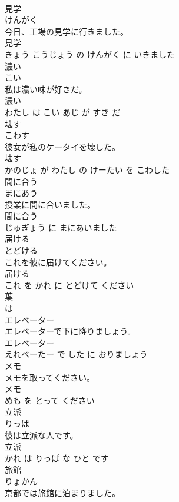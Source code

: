 \documentclass[8pt]{extreport}
\begin{document}
\begin{CJK}{UTF8}{min}
\\	見学	
\\	けんがく			
\\	今日、工場の見学に行きました。	
\\	見学 
\\	きょう こうじょう の けんがく に いきました			
\\	濃い	
\\	こい			
\\	私は濃い味が好きだ。	
\\	濃い 
\\	わたし は こい あじ が すき だ			
\\	壊す	
\\	こわす			
\\	彼女が私のケータイを壊した。	
\\	壊す 
\\	かのじょ が わたし の けーたい を こわした			
\\	間に合う	
\\	まにあう			
\\	授業に間に合いました。	
\\	間に合う 
\\	じゅぎょう に まにあいました			
\\	届ける	
\\	とどける			
\\	これを彼に届けてください。	
\\	届ける 
\\	これ を かれ に とどけて ください			
\\	葉	
\\	は			
\\	エレベーター	
\\	エレベーターで下に降りましょう。	
\\	エレベーター 
\\	えれべーたー で した に おりましょう			
\\	メモ	
\\	メモを取ってください。	
\\	メモ 
\\	めも を とって ください			
\\	立派	
\\	りっぱ			
\\	彼は立派な人です。	
\\	立派 
\\	かれ は りっぱ な ひと です			
\\	旅館	
\\	りょかん			
\\	京都では旅館に泊まりました。	

\end{CJK}
\end{document}
